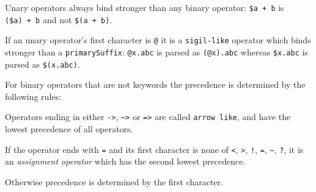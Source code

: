 Unary operators always bind stronger than any binary operator:
\texttt{\$a\ +\ b} is \texttt{(\$a)\ +\ b} and not \texttt{\$(a\ +\ b)}.

If an unary operator's first character is \texttt{@} it is a
\texttt{sigil-like} operator which binds stronger than a
\texttt{primarySuffix}: \texttt{@x.abc} is parsed as \texttt{(@x).abc}
whereas \texttt{\$x.abc} is parsed as \texttt{\$(x.abc)}.

For binary operators that are not keywords the precedence is determined
by the following rules:

Operators ending in either \texttt{-\textgreater{}},
\texttt{\textasciitilde{}\textgreater{}} or \texttt{=\textgreater{}} are
called \texttt{arrow\ like}, and have the lowest precedence of all
operators.

If the operator ends with \texttt{=} and its first character is none of
\texttt{\textless{}}, \texttt{\textgreater{}}, \texttt{!}, \texttt{=},
\texttt{\textasciitilde{}}, \texttt{?}, it is an \emph{assignment
operator} which has the second lowest precedence.

Otherwise precedence is determined by the first character.

